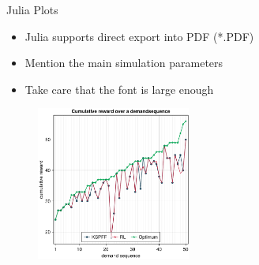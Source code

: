 \documentclass[english,american,german,aspectratio=169]{beamer}
\begin{document}
\begin{frame}{Julia Plots}

  \begin{itemize}
    \item Julia supports direct export into PDF ({*}.PDF)
    \item Mention the main simulation parameters
    \item Take care that the font is large enough
  \end{itemize}
  \begin{figure}
    \includegraphics[width=0.45\textwidth]{img/rewards_unscaled.pdf}
  \end{figure}

\end{frame}
\end{document}

